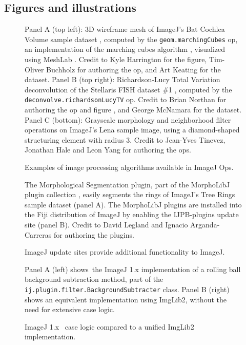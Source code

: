 \documentclass{bmcart}
\begin{document}
\begin{backmatter}
\section*{Figures and illustrations}
  \begin{figure}[h!]
    \caption{Examples of image processing algorithms available in ImageJ Ops.}
    \begin{flushleft}
      Panel A (top left): 3D wireframe mesh of ImageJ's Bat Cochlea Volume
      sample dataset \cite{bat_cochlea_volume}, computed by the
      \texttt{geom.marchingCubes} op, an implementation of the marching cubes
      algorithm \cite{marching_cubes}, visualized using MeshLab \cite{meshlab}.
      Credit to Kyle Harrington for the figure, Tim-Oliver Buchholz for
      authoring the op, and Art Keating for the dataset. Panel B (top right):
      Richardson-Lucy Total Variation deconvolution \cite{richardson_lucy} of
      the Stellaris FISH dataset \#1 \cite{stellaris_fish}, computed by the
      \texttt{deconvolve.richardsonLucyTV} op. Credit to Brian Northan for
      authoring the op and figure \cite{bnorthan_ops_decon}, and George
      McNamara for the dataset. Panel C (bottom): Grayscale morphology and
      neighborhood filter operations on ImageJ's Lena sample image, using a
      diamond-shaped structuring element with radius 3. Credit to Jean-Yves
      Tinevez, Jonathan Hale and Leon Yang for authoring the ops.
    \end{flushleft}
  \end{figure}

  \begin{figure}[h!]
    \caption{ImageJ update sites provide additional functionality to ImageJ.}
    \begin{flushleft}
      The Morphological Segmentation plugin, part of the MorphoLibJ plugin
      collection \cite{morpholibj}, easily segments the rings of ImageJ's Tree
      Rings sample dataset (panel A). The MorphoLibJ plugins are installed into
      the Fiji distribution of ImageJ by enabling the IJPB-plugins update site
      (panel B). Credit to David Legland and Ignacio Arganda-Carreras for
      authoring the plugins.
    \end{flushleft}
  \end{figure}

  \begin{figure}[h!]
    \caption{ImageJ 1.x ~case logic compared to a unified ImgLib2
    implementation.}
    \begin{flushleft}
      Panel A (left) shows~the ImageJ 1.x implementation of a rolling ball
      background subtraction method, part of the
      \texttt{ij.plugin.filter.BackgroundSubtracter} class. Panel B (right)
      shows an equivalent implementation using ImgLib2, without the need for
      extensive case logic.
    \end{flushleft}
  \end{figure}


\end{backmatter}
\end{document}
